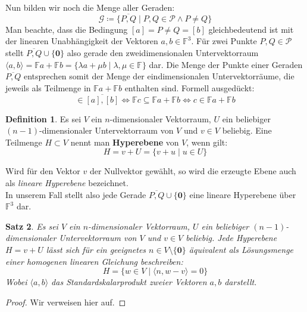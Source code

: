 \documentclass[hidelinks]{article}
\theoremstyle{plain}
\newtheorem{thm}{Satz}[section]
\theoremstyle{definition}
\newtheorem{defn}[thm]{Definition}
\theoremstyle{rem}
\begin{document}
\begin{sloppypar}
Nun bilden wir noch die Menge aller Geraden:
\begin{equation*}
	\mathcal{G}\coloneqq\{\overline{P,Q}\mid P,Q\in\mathcal{P}\land P\ne Q\}
\end{equation*}
Man beachte, dass die Bedingung $[a]=P\ne Q=[b]$ gleichbedeutend ist mit der linearen Unabhängigkeit der Vektoren $a,b\in\mathbb{F}^3$. Für zwei Punkte $P,Q\in\mathcal{P}$ stellt $\overline{P,Q}\cup\{\boldsymbol 0\}$ also gerade den zweidimensionalen Untervektorraum $\langle a,b\rangle=\mathbb{F}a+\mathbb{F}b=\{\lambda a+\mu b\mid \lambda,\mu\in\mathbb{F}\}$ dar. 
Die Menge der Punkte einer Geraden $\overline{P,Q}$ entsprechen somit der Menge der eindimensionalen Untervektorräume, die jeweils als Teilmenge in $\mathbb{F}a+\mathbb{F}b$ enthalten sind. Formell ausgedückt:
\begin{equation*}
	[c]\in\overline{[a],[b]}\Leftrightarrow \mathbb{F}c\subseteq\mathbb{F}a+\mathbb{F}b\Leftrightarrow c\in\mathbb{F}a+\mathbb{F}b
\end{equation*}
\begin{defn}
	Es sei $V$ ein $n$-dimensionaler Vektorraum, $U$ ein beliebiger \mbox{$(n-1)$-dimensionaler} Untervektorraum von $V$ und $v\in V$ beliebig. Eine Teilmenge $H\subset V$ nennt man \textbf{Hyperebene} von $V$, wenn gilt:
\begin{equation*}
	H=v+U=\{v+u\mid u\in U\} 
\end{equation*}
\end{defn}
Wird für den Vektor $v$ der Nullvektor gewählt, so wird die erzeugte Ebene auch als \textit{lineare Hyperebene} bezeichnet.\\
In unserem Fall stellt also jede Gerade $\overline{P,Q}\cup\{\boldsymbol 0\}$ eine lineare Hyperebene über $\mathbb{F}^3$ dar.
\begin{thm}\label{hyperebene}
Es sei $V$ ein $n$-dimensionaler Vektorraum, $U$ ein beliebiger $(n-1)$-dimensionaler Untervektorraum von $V$ und $v\in V$ beliebig. 
Jede Hyperebene $H=v+U$ lässt sich für ein geeignetes $n\in V\setminus\{\boldsymbol 0\}$ äquivalent als Lösungsmenge einer homogenen linearen Gleichung beschreiben:
\begin{equation*}
	H=\{w\in V\mid \langle n,w-v\rangle=0\}
\end{equation*}
Wobei $\langle a,b\rangle$ das Standardskalarprodukt zweier Vektoren $a,b$ darstellt.
\end{thm}
\begin{proof}
	Wir verweisen hier auf\cite[Seite~189]{linalg}.
\end{proof}

\end{sloppypar}
\end{document}
